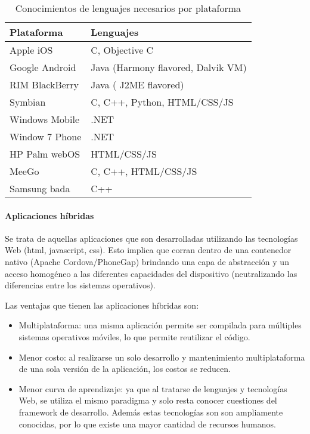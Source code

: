 \begin{table}[]
\centering
\caption{Conocimientos de lenguajes necesarios por plataforma\cite{charland2011mobile}}
\label{languajes_plataforma}
\begin{tabular}{|l|l|}
\hline
\textbf{Plataforma} & \textbf{Lenguajes}                 \\ \hline
Apple iOS           & C, Objective C                     \\ \hline
Google Android      & Java (Harmony flavored, Dalvik VM) \\ \hline
RIM BlackBerry      & Java ( J2ME flavored)              \\ \hline
Symbian             & C, C++, Python, HTML/CSS/JS        \\ \hline
Windows Mobile      & .NET                               \\ \hline
Window 7 Phone      & .NET                               \\ \hline
HP Palm webOS       & HTML/CSS/JS                        \\ \hline
MeeGo               & C, C++, HTML/CSS/JS                \\ \hline
Samsung bada        & C++                                \\ \hline
\end{tabular}
\end{table}

\paragraph{Aplicaciones híbridas}
\label{apps_hibirdas}

Se trata de aquellas aplicaciones que son desarrolladas utilizando las tecnologías Web (\gls{html}, \gls{javascript}, \gls{css}). Esto implica que corran dentro de una contenedor nativo (Apache Cordova/PhoneGap) brindando una capa de abstracción y un acceso homogéneo a las diferentes capacidades del dispositivo (neutralizando las diferencias entre los sistemas operativos).

Las ventajas que tienen las aplicaciones híbridas son:
\begin{itemize}
\item Multiplataforma: una misma aplicación permite ser compilada para múltiples sistemas operativos móviles, lo que permite reutilizar el código.
\item Menor costo: al realizarse un solo desarrollo y mantenimiento multiplataforma de una sola versión de la aplicación, los costos se reducen.
\item Menor curva de aprendizaje: ya que al tratarse de lenguajes y tecnologías Web, se utiliza el mismo paradigma y solo resta conocer cuestiones del \gls{framework} de desarrollo. Además estas tecnologías son  son ampliamente conocidas, por lo que existe una mayor cantidad de recursos humanos.
\end{itemize}

